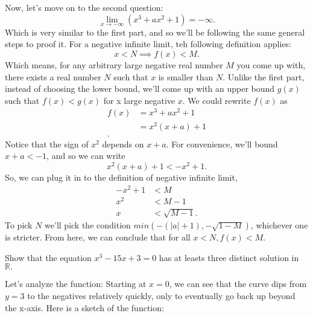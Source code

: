 \documentclass[a4paper]{article}
\begin{document}
 \noindent Now, let's move on to the second question: \[
 \lim_{x \to -\infty}(x^3 + ax^2 + 1) = -\infty
 .\] 
 Which is very similar to the first part, and so we'll be following the same general steps to proof it. For a negative infinite limit, teh following definition applies: \[
 x < N \implies f(x) < M
 .\] 
Which means, for any arbitrary large negative real number $M$ you come up with, there exists a real number $N$ such that $x$ is smaller than $N$. Unlike the first part, instead of choosing the lower bound, we'll come up with an upper bound $g(x)$ such that $f(x) < g(x)$ for x large negative $x$. We could rewrite $f(x)$ as 
\begin{align*}
	f(x) &= x^3 + ax^2 + 1 \\
	&= x^2(x + a) + 1 \\
.\end{align*} Notice that the sign of $x^2$ depends on $x + a$. For convenience, we'll bound $x + a < -1$, and so we can  write \[
x^2(x + a) + 1 < -x^2 + 1
.\] So, we can plug it in to the definition of negative infinite limit,
\begin{align*}
	-x^2 + 1 &< M \\
	x^2 &< M - 1 \\
	x &< \sqrt{M -1} 
.\end{align*}
To pick $N$ we'll pick the condition $min(-(|a| + 1), -\sqrt{1 - M} )$, whichever one is stricter. From here, we can conclude that for all $x < N, f(x) < M$.

\begin{tcolorbox}[title=Question 2]
	Show that the equation $x^3 - 15x + 3 = 0$ has at leasts three distinct solution in $\mathbb{R}.$
\end{tcolorbox}

\vspace{5pt}

Let's analyze the function: Starting at $x = 0$, we can see that the curve dips from $y = 3$ to the negatives relatively quickly, only to eventually go back up beyond the x-axis. Here is a sketch of the function:


\vspace{5pt}
\begin{center}
\end{center}
\end{document}
